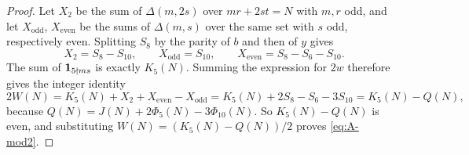 \begin{proof}
Let $X_2$ be the sum of $\Delta(m,2s)$ over $mr+2st=N$ with $m,r$ odd, and let
$X_{\mathrm{odd}}$, $X_{\mathrm{even}}$ be the sums of $\Delta(m,s)$ over the same set with
$s$ odd, respectively even. Splitting $S_8$ by the parity of $b$ and then of $y$
gives
\[
  X_2=S_8-S_{10},\qquad X_{\mathrm{odd}}=S_{10},\qquad X_{\mathrm{even}}=S_8-S_6-S_{10}.
\]
The sum of $\mathbf 1_{5\nmid ms}$ is exactly $K_5(N)$. Summing the expression for $2w$
therefore gives the integer identity
\[
  2W(N)=K_5(N)+X_2+X_{\mathrm{even}}-X_{\mathrm{odd}}=K_5(N)+2S_8-S_6-3S_{10}=K_5(N)-Q(N),
\]
because $Q(N)=J(N)+2\Phi_5(N)-3\Phi_{10}(N)$. So $K_5(N)-Q(N)$ is even, and
substituting $W(N)=(K_5(N)-Q(N))/2$ proves \eqref{eq:A-mod2}.
\end{proof}
